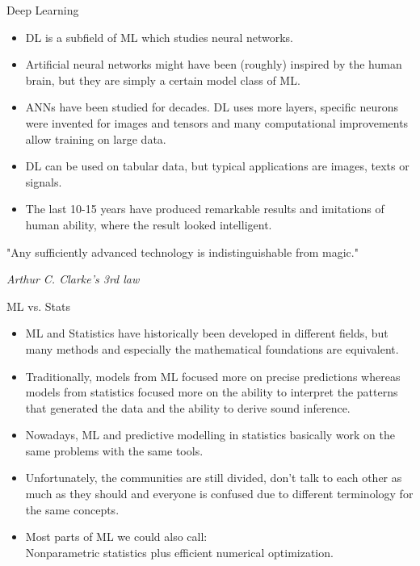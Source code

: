 \documentclass[11pt,compress,t,notes=noshow, xcolor=table]{beamer}
\begin{document}
\begin{vbframe}{Deep Learning}

\begin{itemize}
\item DL is a subfield of ML which studies neural networks.
\item Artificial neural networks might have been (roughly) inspired by the human brain, but they are simply a certain model class of ML.
\item ANNs have been studied for decades. DL uses more layers, 
        specific neurons were invented for images and tensors and many computational 
        improvements allow training on large data.
\item DL can be used on tabular data, but typical applications are images, texts or signals. 
\item The last 10-15 years have produced remarkable results and imitations of human ability, where the result looked intelligent. 
\end{itemize}

\lz

"Any sufficiently advanced technology is indistinguishable from magic."
\begin{footnotesize}
\emph{Arthur C. Clarke's 3rd law}
\end{footnotesize}
 

\end{vbframe}


\begin{frame}{ML vs. Stats}


\begin{itemize}
	\item ML and Statistics have historically been developed in different fields, but many
      methods and especially the mathematical foundations are equivalent.
	\item Traditionally, models from ML focused more on precise predictions whereas models from statistics focused more on the ability to interpret the patterns that generated the data and the ability to derive sound inference.
	\item Nowadays, ML and predictive modelling in statistics basically work on the same problems with the same tools.
    \item Unfortunately, the communities are still divided, don't talk to each other as much as they should and everyone is confused due to different terminology for the same concepts.
    \item Most parts of ML we could also call:\\Nonparametric statistics plus efficient numerical optimization.
\end{itemize}

\end{frame}
\end{document}
